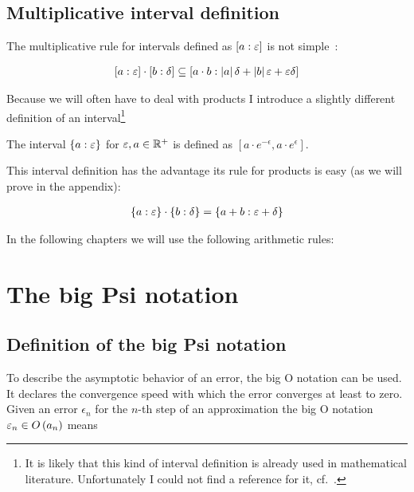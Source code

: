 

\subsection{Multiplicative interval definition}

The multiplicative rule for intervals defined as $\an{a}$ is not simple~\cite[p.~22]{kulla}:

\begin{align}
  \an[\epsilon]{a} \cdot \an[\delta]{b} \subseteq \an[\abs{a}\delta+\abs{b}\epsilon+\epsilon\delta]{a\cdot b}
\end{align}

Because we will often have to deal with products I introduce a slightly different definition of an interval\footnote{It is likely that this kind of interval definition is already used in mathematical literature. Unfortunately I could not find a reference for it, cf.~\cite{tampis:ean}.}

\begin{definition}
  The interval $\ean{a}$ for $\epsilon,a\in\Rplus$ is defined as $\left[a\cdot e^{-\epsilon},a\cdot e^\epsilon\right]$.
\end{definition}

This interval definition has the advantage its rule for products is easy (as we will prove in the appendix):

\begin{align}
  \ean[\epsilon]{a}\cdot \ean[\delta]{b} = \ean[\epsilon+\delta]{a+b}
\end{align}

\noindent In the following chapters we will use the following arithmetic rules:



\section{The big Psi notation}

\subsection{Definition of the big Psi notation}
To describe the asymptotic behavior of an error, the big O notation can be used. It declares the convergence speed with which the error converges at least to zero. Given an error $\epsilon_n$ for the $n$-th step of an approximation the big O notation $\epsilon_n \in \bigo{a_n}$ means~\cite[p.~444]{graham}\cite[p.~100]{aigner}

